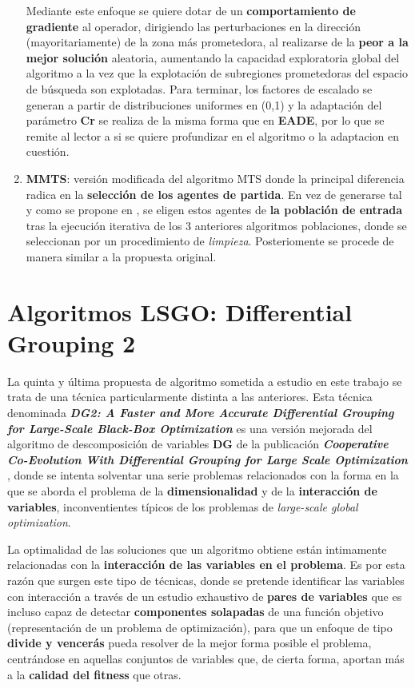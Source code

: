 \begin{enumerate}
\begin{itemize}
	\end{itemize}

	Mediante este enfoque se quiere dotar de un \textbf{comportamiento de gradiente} al operador, dirigiendo las perturbaciones en la dirección (mayoritariamente) de la zona más prometedora, al realizarse de la \textbf{peor a la mejor solución} aleatoria, aumentando la capacidad exploratoria global del algoritmo a la vez que la explotación de subregiones prometedoras del espacio de búsqueda son explotadas. Para terminar, los factores de escalado se generan a partir de distribuciones uniformes en (0,1) y la adaptación del parámetro \textbf{Cr} se realiza de la misma forma que en \textbf{EADE}, por lo que se remite al lector a \cite{ANDE} si se quiere profundizar en el algoritmo o la adaptacion en cuestión.
	
	\item \textbf{MMTS}: versión modificada del algoritmo MTS donde la principal diferencia radica en la \textbf{selección de los agentes de partida}. En vez de generarse tal y como se propone en \cite{MTS-LSGO}, se eligen estos agentes de \textbf{la población de entrada} tras la ejecución iterativa de los 3 anteriores algoritmos poblaciones, donde se seleccionan por un procedimiento de \textit{limpieza}. Posteriomente se procede de manera similar a la propuesta original.
	
\end{enumerate} 
\newpage
\section{Algoritmos LSGO: Differential Grouping 2}

La quinta y última propuesta de algoritmo sometida a estudio en este trabajo se trata de una técnica particularmente distinta a las anteriores. Esta técnica denominada \textbf{\textit{DG2: A Faster and More Accurate Differential Grouping for Large-Scale Black-Box Optimization}}\cite{DG2} es una versión mejorada del algoritmo de descomposición de variables \textbf{DG} de la publicación \textbf{\textit{Cooperative Co-Evolution With Differential Grouping for Large Scale Optimization}} \cite{DG}, donde se intenta solventar una serie problemas relacionados con la forma en la que se aborda el problema de la \textbf{dimensionalidad} y de la \textbf{interacción de variables}, inconventientes típicos de los problemas de \textit{large-scale global optimization}.

La optimalidad de las soluciones que un algoritmo obtiene están intimamente relacionadas con la \textbf{interacción de las variables en el problema}. Es por esta razón que surgen este tipo de técnicas, donde se pretende identificar las variables con interacción a través de un estudio exhaustivo de \textbf{pares de variables} que es incluso capaz de detectar \textbf{componentes solapadas} de una función objetivo (representación de un problema de optimización), para que un enfoque de tipo \textbf{divide y vencerás} pueda resolver de la mejor forma posible el problema, centrándose en aquellas conjuntos de variables que, de cierta forma, aportan más a la \textbf{calidad del fitness} que otras.

